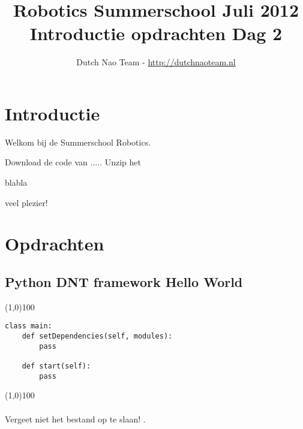 \documentclass[a4paper]{article}
\title{\textbf{Robotics Summerschool Juli 2012} \\ Introductie opdrachten Dag 2}
\author{Dutch Nao Team - \url{http://dutchnaoteam.nl}}
\date{}
\begin{document}
\maketitle

\section{Introductie}
Welkom bij de Summerschool Robotics.

Download de code van .....
Unzip het 

blabla

veel plezier!


\tableofcontents

\newpage


\section{Opdrachten}

\subsection{Python DNT framework Hello World}


\noindent \line(1,0){100}
\begin{verbatim}
class main:
    def setDependencies(self, modules):
        pass

    def start(self):
        pass
\end{verbatim}
\noindent \line(1,0){100}
\\\\
Vergeet niet het bestand op te slaan!
.
\end{document}
